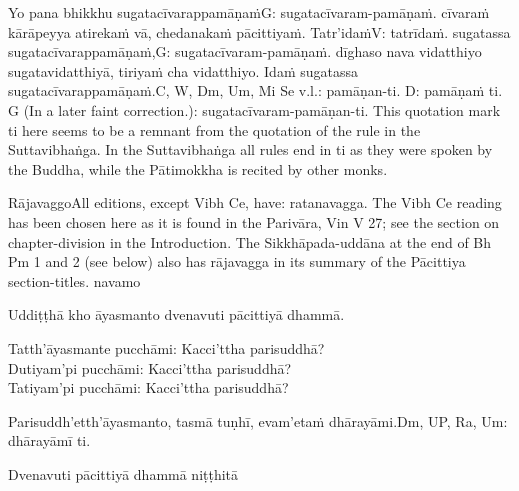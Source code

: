 Yo pana bhikkhu sugatacīvarappamāṇaṁ\makeatletter\hyperlink{endnote-appendix}\makeatother G: sugatacīvaram-pamāṇaṁ. cīvaraṁ kārāpeyya atirekaṁ vā, chedanakaṁ pācittiyaṁ. Tatr'idaṁ\makeatletter\hyperlink{endnote-appendix}\makeatother V: tatrīdaṁ. sugatassa sugatacīvarappamāṇaṁ,\makeatletter\hyperlink{endnote-appendix}\makeatother G: sugatacīvaram-pamāṇaṁ. dīghaso nava vidatthiyo sugatavidatthiyā, tiriyaṁ cha vidatthiyo. Idaṁ sugatassa sugatacīvarappamāṇaṁ.\makeatletter\hyperlink{endnote-appendix}\makeatother C, W, Dm, Um, Mi Se v.l.:  pamāṇan-ti. D:  pamāṇaṁ ti. G (In a later faint correction.): sugatacīvaram-pamāṇan-ti. This
quotation mark ti here seems to be a remnant from the quotation of the rule in the Suttavibhaṅga. In the Suttavibhaṅga all
rules end in ti as they were spoken by the Buddha, while the Pātimokkha is recited by other monks.

\begin{center}
	Rājavaggo\makeatletter\hyperlink{endnote-appendix}\makeatother All editions, except Vibh Ce, have: ratanavagga. The Vibh Ce reading has been chosen here as it is found in the Parivāra,
Vin V 27; see the section on chapter-division in the Introduction. The Sikkhāpada-uddāna at the end of Bh Pm 1 and 2 (see
below) also has rājavagga in its summary of the Pācittiya section-titles. navamo
\end{center}



\medskip

\begin{center}
	Uddiṭṭhā kho āyasmanto dvenavuti pācittiyā dhammā.

	\smallskip

	Tatth'āyasmante pucchāmi: Kacci'ttha parisuddhā?\\
	Dutiyam'pi pucchāmi: Kacci'ttha parisuddhā?\\
	Tatiyam'pi pucchāmi: Kacci'ttha parisuddhā?

	\smallskip

	Parisuddh'etth'āyasmanto, tasmā tuṇhī, evam'etaṁ dhārayāmi.\makeatletter\hyperlink{endnote-appendix}\makeatother Dm, UP, Ra, Um: dhārayāmī ti.
\end{center}

\begin{outro}
	Dvenavuti pācittiyā dhammā niṭṭhitā
\end{outro}

\clearpage

